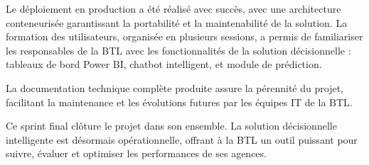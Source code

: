 Le déploiement en production a été réalisé avec succès, avec une architecture conteneurisée garantissant la portabilité et la maintenabilité de la solution. La formation des utilisateurs, organisée en plusieurs sessions, a permis de familiariser les responsables de la BTL avec les fonctionnalités de la solution décisionnelle : tableaux de bord Power BI, chatbot intelligent, et module de prédiction.

La documentation technique complète produite assure la pérennité du projet, facilitant la maintenance et les évolutions futures par les équipes IT de la BTL.

Ce sprint final clôture le projet dans son ensemble. La solution décisionnelle intelligente est désormais opérationnelle, offrant à la BTL un outil puissant pour suivre, évaluer et optimiser les performances de ses agences.